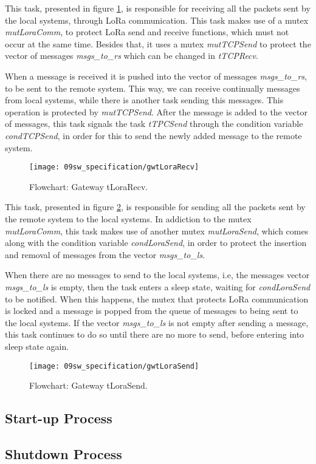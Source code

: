 This task, presented in figure \ref{fig:gwtLoraRecv}, is responsible for receiving all the packets sent by the local systems, through LoRa communication. This task makes use of a mutex \textit{mutLoraComm}, to protect LoRa send and receive functions, which must not occur at the same time. Besides that, it uses a mutex \textit{mutTCPSend} to protect the vector of messages \textit{msgs\_to\_rs} which can be changed in \textit{tTCPRecv}.

When a message is received it is pushed into the vector of messages \textit{msgs\_to\_rs}, to be sent to the remote system. This way, we can receive continually messages from local systems, while there is another task sending this messages. This operation is protected by \textit{mutTCPSend}. After the message is added to the vector of messages, this task signals the task \textit{tTPCSend} through the condition variable \textit{condTCPSend}, in order for this to send the newly added message to the remote system.

\begin{figure}[H]
	\centering
	\texttt{[image: 09sw\_specification/gwtLoraRecv]}
	\caption{Flowchart: Gateway tLoraRecv.}
	\label{fig:gwtLoraRecv}
\end{figure}

This task, presented in figure \ref{fig:gwtLoraSend}, is responsible for sending all the packets sent by the remote system to the local systems. In addiction to the mutex \textit{mutLoraComm}, this task makes use of another mutex \textit{mutLoraSend}, which comes along with the condition variable \textit{condLoraSend}, in order to protect the insertion and removal of messages from the vector \textit{msgs\_to\_ls}.

When there are no messages to send to the local systems, i.e, the messages vector \textit{msgs\_to\_ls} is empty, then the task enters a sleep state, waiting for \textit{condLoraSend} to be notified. When this happens, the mutex that protects LoRa communication is locked and a message is popped from the queue of messages to being sent to the local systems. If the vector \textit{msgs\_to\_ls} is not empty after sending a message, this task continues to do so until there are no more to send, before entering into sleep state again.

\begin{figure}[H]
	\centering
	\texttt{[image: 09sw\_specification/gwtLoraSend]}
	\caption{Flowchart: Gateway tLoraSend.}
	\label{fig:gwtLoraSend}
\end{figure}


\subsection{Start-up Process}

\subsection{Shutdown Process}
